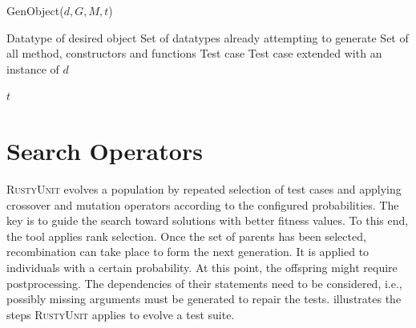 \documentclass[paper=a4,%
  twoside,%
  BCOR4mm,%
  abstract=true,%
  toc=bibliography,%
  chapterprefix=true,%
  toc=bibliographynumbered,%
  open=right,%
  english,%
  pagesize=pdftex]{scrreprt}
\newcommand{\Desc}[2]{\State \makebox[2em][l]{#1}#2}
\newcommand{\tech}{\textsc{RustyUnit}\xspace}
\begin{document}
\begin{algorithm}[t]
\caption{GenObject($d, G, M, t$)}
\label{alg:genobject}
\begin{algorithmic}
\Input
  \Desc{$d$}{Datatype of desired object}
  \Desc{$G$}{Set of datatypes already attempting to generate}
  \Desc{$M$}{Set of all method, constructors and functions}
  \Desc{$t$}{Test case}
\EndInput
\Output
  \Desc{$t$}{Test case extended with an instance of $d$}
\EndOutput
{}

  \EndIf
\EndFor
{}
\State \Return $t$
\end{algorithmic}
\end{algorithm}

\section{Search Operators}
\label{sec:search-operators}
\tech evolves a population by repeated selection of test cases and applying crossover and mutation operators according to the configured probabilities. The key is to guide the search toward solutions with better fitness values. To this end, the tool applies rank selection. Once the set of parents has been selected, recombination can take place to form the next generation. It is applied to individuals with a certain probability. At this point, the offspring might require postprocessing. The dependencies of their statements need to be considered, i.e., possibly missing arguments must be generated to repair the tests.  illustrates the steps \tech applies to evolve a test suite.
\end{document}
